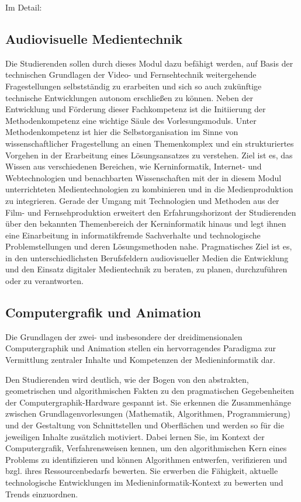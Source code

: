 Im Detail:

\subsection{Audiovisuelle
Medientechnik}\label{audiovisuelle-medientechnik}

Die Studierenden sollen durch dieses Modul dazu befähigt werden, auf
Basis der technischen Grundlagen der Video- und Fernsehtechnik
weitergehende Fragestellungen selbstständig zu erarbeiten und sich so
auch zukünftige technische Entwicklungen autonom erschließen zu können.
Neben der Entwicklung und Förderung dieser Fachkompetenz ist die
Initiierung der Methodenkompetenz eine wichtige Säule des
Vorlesungsmoduls. Unter Methodenkompetenz ist hier die
Selbstorganisation im Sinne von wissenschaftlicher Fragestellung an
einen Themenkomplex und ein strukturiertes Vorgehen in der Erarbeitung
eines Lösungsansatzes zu verstehen. Ziel ist es, das Wissen aus
verschiedenen Bereichen, wie Kerninformatik, Internet- und
Webtechnologien und benachbarten Wissenschaften mit der in diesem Modul
unterrichteten Medientechnologien zu kombinieren und in die
Medienproduktion zu integrieren. Gerade der Umgang mit Technologien und
Methoden aus der Film- und Fernsehproduktion erweitert den
Erfahrungshorizont der Studierenden über den bekannten Themenbereich der
Kerninformatik hinaus und legt ihnen eine Einarbeitung in
informatikfremde Sachverhalte und technologische Problemstellungen und
deren Lösungsmethoden nahe. Pragmatisches Ziel ist es, in den
unterschiedlichsten Berufsfeldern audiovisueller Medien die Entwicklung
und den Einsatz digitaler Medientechnik zu beraten, zu planen,
durchzuführen oder zu verantworten.

\subsection{Computergrafik und
Animation}\label{computergrafik-und-animation}

Die Grundlagen der zwei- und insbesondere der dreidimensionalen
Computergraphik und Animation stellen ein hervorragendes Paradigma zur
Vermittlung zentraler Inhalte und Kompetenzen der Medieninformatik dar.

Den Studierenden wird deutlich, wie der Bogen von den abstrakten,
geometrischen und algorithmischen Fakten zu den pragmatischen
Gegebenheiten der Computergraphik-Hardware gespannt ist. Sie erkennen
die Zusammenhänge zwischen Grundlagenvorlesungen (Mathematik,
Algorithmen, Programmierung) und der Gestaltung von Schnittstellen und
Oberflächen und werden so für die jeweiligen Inhalte zusätzlich
motiviert. Dabei lernen Sie, im Kontext der Computergrafik,
Verfahrensweisen kennen, um den algorithmischen Kern eines Problems zu
identifizieren und können Algorithmen entwerfen, verifizieren und bzgl.
ihres Ressourcenbedarfs bewerten. Sie erwerben die Fähigkeit, aktuelle
technologische Entwicklungen im Medieninformatik-Kontext zu bewerten und
Trends einzuordnen.

